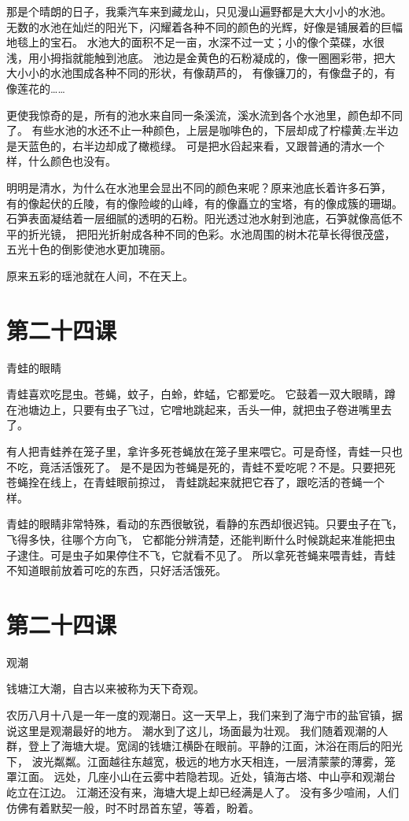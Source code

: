 \documentclass[12pt,UTF8]{ctexbook}
\begin{document}
那是个晴朗的日子，我乘汽车来到藏龙山，只见漫山遍野都是大大小小的水池。
无数的水池在灿烂的阳光下，闪耀着各种不同的颜色的光辉，好像是铺展着的巨幅地毯上的宝石。
水池大的面积不足一亩，水深不过一丈；小的像个菜碟，水很浅，用小拇指就能触到池底。
池边是金黄色的石粉凝成的，像一圈圈彩带，把大大小小的水池围成各种不同的形状，有像葫芦的，
有像镰刀的，有像盘子的，有像莲花的……

更使我惊奇的是，所有的池水来自同一条溪流，溪水流到各个水池里，颜色却不同了。
有些水池的水还不止一种颜色，上层是咖啡色的，下层却成了柠檬黄;左半边是天蓝色的，右半边却成了橄榄绿。
可是把水舀起来看，又跟普通的清水一个样，什么颜色也没有。

明明是清水，为什么在水池里会显出不同的颜色来呢？原来池底长着许多石笋，
有的像起伏的丘陵，有的像险峻的山峰，有的像矗立的宝塔，有的像成簇的珊瑚。
石笋表面凝结着一层细腻的透明的石粉。阳光透过池水射到池底，石笋就像高低不平的折光镜，
把阳光折射成各种不同的色彩。水池周围的树木花草长得很茂盛，五光十色的倒影使池水更加瑰丽。

原来五彩的瑶池就在人间，不在天上。

\section{第二十四课}

青蛙的眼睛

青蛙喜欢吃昆虫。苍蝇，蚊子，白蛉，蚱蜢，它都爱吃。
它鼓着一双大眼睛，蹲在池塘边上，只要有虫子飞过，它噌地跳起来，舌头一伸，就把虫子卷进嘴里去了。

有人把青蛙养在笼子里，拿许多死苍蝇放在笼子里来喂它。可是奇怪，青蛙一只也不吃，竟活活饿死了。
是不是因为苍蝇是死的，青蛙不爱吃呢？不是。只要把死苍蝇拴在线上，在青蛙眼前掠过，
青蛙跳起来就把它吞了，跟吃活的苍蝇一个样。

青蛙的眼睛非常特殊，看动的东西很敏锐，看静的东西却很迟钝。只要虫子在飞，飞得多快，往哪个方向飞，
它都能分辨清楚，还能判断什么时候跳起来准能把虫子逮住。可是虫子如果停住不飞，它就看不见了。
所以拿死苍蝇来喂青蛙，青蛙不知道眼前放着可吃的东西，只好活活饿死。

\section{第二十四课}

观潮

钱塘江大潮，自古以来被称为天下奇观。

农历八月十八是一年一度的观潮日。这一天早上，我们来到了海宁市的盐官镇，据说这里是观潮最好的地方。
潮水到了这儿，场面最为壮观。
我们随着观潮的人群，登上了海塘大堤。宽阔的钱塘江横卧在眼前。平静的江面，沐浴在雨后的阳光下，
波光粼粼。江面越往东越宽，极远的地方水天相连，一层清蒙蒙的薄雾，笼罩江面。
远处，几座小山在云雾中若隐若现。近处，镇海古塔、中山亭和观潮台屹立在江边。
江潮还没有来，海塘大堤上却已经满是人了。
没有多少喧闹，人们仿佛有着默契一般，时不时昂首东望，等着，盼着。
\end{document}
